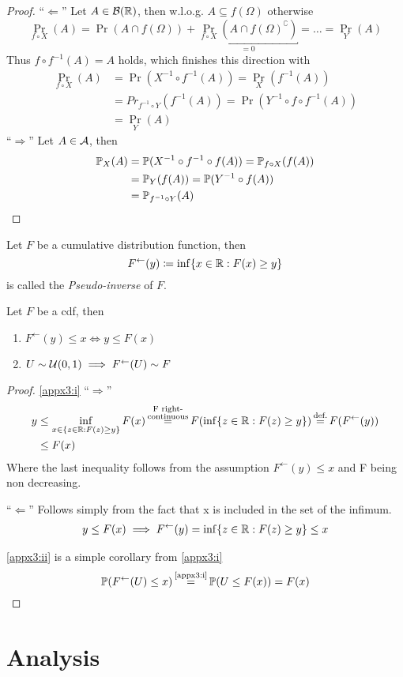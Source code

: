\begin{proof}
    ``\(\Leftarrow\)'' Let \(A\in\cB(\R)\), then w.l.o.g. \(A\subseteq f(\Omega)\) otherwise
    \[
        \Pr_{f\circ X}(A)=\Pr(A\cap f(\Omega))+\underbracket{
            \Pr_{f\circ X}(A\cap f(\Omega)^\complement)
            }_{=0}=\dotsc=\Pr_Y(A) 
    \]
    Thus \(f\circ f^{-1}(A)=A\) holds, which finishes this direction with
    \begin{align*}
        \Pr_{f\circ X}(A)
        &=\Pr(X^{-1}\circ f^{-1}(A))=\Pr_X(f^{-1}(A))\\
        &=Pr_{f^{-1}\circ Y}(f^{-1}(A))=\Pr(Y^{-1}\circ f\circ f^{-1}(A))\\
        &=\Pr_Y(A)
    \end{align*}
    ``\(\Rightarrow\)'' Let \(A\in\cA\), then
    \begin{align*}
        \Pr_X(A)&=\Pr(X^{-1}\circ f^{-1}\circ f(A))=\Pr_{f\circ X}(f(A))\\
        &=\Pr_Y(f(A))=\Pr(Y^{-1}\circ f(A))\\
        &=\Pr_{f^{-1}\circ Y}(A) \qedhere
    \end{align*}
\end{proof}
\begin{definition}\label{appx3}
    Let \(F\) be a cumulative distribution function, then 
    \[F^\leftarrow (y) \coloneqq \inf\{x\in\R : F(x)\ge y \}\]
    is called the \emph{Pseudo-inverse} of \(F\).
\end{definition}
\begin{lemma}
    Let \(F\) be a cdf, then
    \begin{enumerate}[label=(\roman*), font=\normalfont]
        \item\label{appx3:i} \(
            F^\leftarrow (y)\le x \iff y \le F(x)
        \)
        \item\label{appx3:ii} \(U\sim\cU(0,1) \implies F^\leftarrow(U) \sim F \)
    \end{enumerate}
\end{lemma}
\begin{proof}
    \ref{appx3:i} ``\(\Rightarrow\)''
    \begin{align*}
        y&\le \inf_{x\in \{z\in\R: F(z)\ge y\}} F(x) 
        \xeq{\substack{
            \text{F right-}\\
            \text{continuous}}
        } F(\inf\{z\in\R: F(z)\ge y\})
        \xeq{\text{def.}} F(F^\leftarrow(y))\\
        &\le F(x)
    \end{align*}
    Where the last inequality follows from the assumption \(F^\leftarrow (y)\le x\) and F being non decreasing.

    \noindent ``\(\Leftarrow\)'' Follows simply from the fact that x is included in the set of the infimum. 
    \begin{align*}
        y\le F(x) \implies F^\leftarrow (y) = \inf\{z\in\R:F(z)\ge y\} \le x
    \end{align*}

    \noindent \ref{appx3:ii} is a simple corollary from \ref{appx3:i}
    \[
        \Pr(F^\leftarrow (U)\le x) 
        \xeq{\text{\ref{appx3:i}}} \Pr(U\le F(x)) = F(x) 
        \qedhere
    \]
\end{proof}
\section{Analysis}
\endinput
